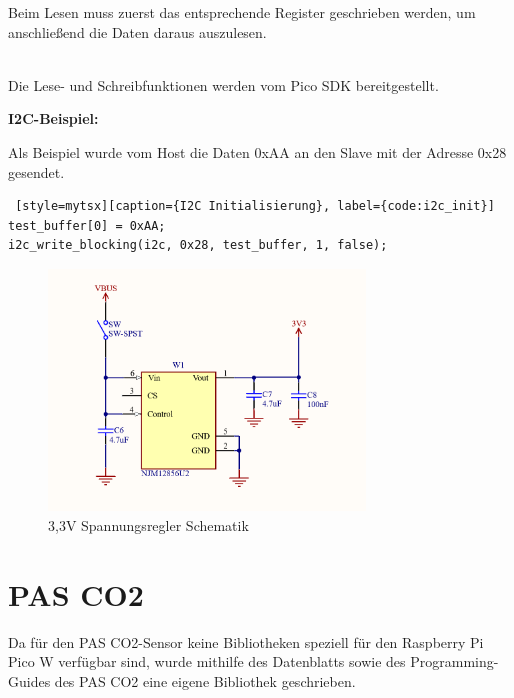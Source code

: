 \begin{inhalt}
Beim Lesen muss zuerst das entsprechende Register geschrieben werden, um anschließend die Daten daraus auszulesen. 

\bigskip \\
Die Lese- und Schreibfunktionen werden vom Pico SDK bereitgestellt.

\textbf{I2C-Beispiel:}

Als Beispiel wurde vom Host die Daten 0xAA an den Slave mit der Adresse 0x28 gesendet. 

\begin{lstlisting} [style=mytsx][caption={I2C Initialisierung}, label={code:i2c_init}]
test_buffer[0] = 0xAA;
i2c_write_blocking(i2c, 0x28, test_buffer, 1, false);
\end{lstlisting}

\begin{figure}[!htb]
\centering
\includegraphics[width=0.75\textwidth]{files/Tobias/pics/Schaltungen/Schematik/3V3_Converter_Schematik.PNG}
\caption[3,3V Spannungsregler Schematik]{3,3V Spannungsregler Schematik}
\label{fig:3,3V Spannungsregler Schematik}
\end{figure}



\section{PAS CO2}

Da für den PAS CO2-Sensor keine Bibliotheken speziell für den Raspberry Pi Pico W verfügbar sind, wurde mithilfe des Datenblatts \cite{Raspberry_Pi_Pico_W} sowie des Programming-Guides \cite{PASCO2_ProgrammingGuide} des PAS CO2 eine eigene Bibliothek geschrieben.

\bigskip \\


\end{inhalt}
